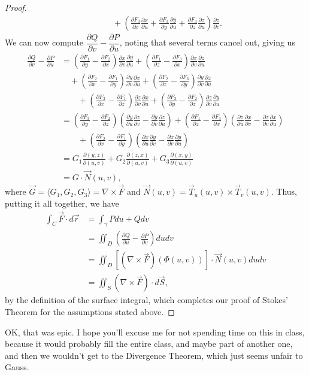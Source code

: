 \documentclass[12pt,letterpaper]{article}
\begin{document}
\begin{proof}
\begin{align*}
& \quad\quad +\left(\frac{\partial F_3}{\partial x}\frac{\partial x}{\partial u}+\frac{\partial F_3}{\partial y}\frac{\partial y}{\partial u}+\frac{\partial F_3}{\partial z}\frac{\partial z}{\partial u}\right)\frac{\partial z}{\partial v}.
\end{align*}
We can now compute $\dfrac{\partial Q}{\partial v}-\dfrac{\partial P}{\partial u}$, noting that several terms cancel out, giving us
\begin{align*}
 \frac{\partial Q}{\partial v}-\frac{\partial P}{\partial u} & = \left(\frac{\partial F_1}{\partial y}-\frac{\partial F_2}{\partial x}\right)\frac{\partial x}{\partial v}\frac{\partial y}{\partial u}+\left(\frac{\partial F_1}{\partial z}-\frac{\partial F_3}{\partial x}\right)\frac{\partial x}{\partial v}\frac{\partial z}{\partial u}\\
&\quad + \left(\frac{\partial F_2}{\partial x}-\frac{\partial F_1}{\partial y}\right)\frac{\partial y}{\partial v}\frac{\partial x}{\partial u}+\left(\frac{\partial F_2}{\partial z}-\frac{\partial F_3}{\partial y}\right)\frac{\partial y}{\partial v}\frac{\partial z}{\partial u}\\
&  \quad \quad + \left(\frac{\partial F_3}{\partial x}-\frac{\partial F_1}{\partial z}\right)\frac{\partial z}{\partial v}\frac{\partial x}{\partial u}+\left(\frac{\partial F_3}{\partial y}-\frac{\partial F_2}{\partial z}\right)\frac{\partial z}{\partial v}\frac{\partial y}{\partial u}\\
& = \left(\frac{\partial F_3}{\partial y}-\frac{\partial F_2}{\partial z}\right)\left(\frac{\partial y}{\partial u}\frac{\partial z}{\partial v}-\frac{\partial y}{\partial v}\frac{\partial z}{\partial u}\right)+\left(\frac{\partial F_1}{\partial z}-\frac{\partial F_3}{\partial x}\right)\left(\frac{\partial z}{\partial u}\frac{\partial x}{\partial v}-\frac{\partial z}{\partial v}\frac{\partial x}{\partial u}\right)\\
&\quad \quad +\left(\frac{\partial F_2}{\partial x}-\frac{\partial F_1}{\partial y}\right)\left(\frac{\partial x}{\partial u}\frac{\partial y}{\partial v}-\frac{\partial x}{\partial v}\frac{\partial y}{\partial u}\right)\\
& = G_1\frac{\partial(y,z)}{\partial(u,v)}+G_2\frac{\partial(z,x)}{\partial (u,v)}+G_3\frac{\partial (x,y)}{\partial (u,v)}\\
& = G\cdot \vec{N}(u,v),
\end{align*}
where $\vec{G} = \langle G_1,G_2,G_3\rangle = \nabla\times \vec{F}$ and $\vec{N}(u,v) = \vec{T}_u(u,v)\times\vec{T}_v(u,v)$. Thus, putting it all together, we have
\begin{align*}
 \int_C \vec{F}\cdot d\vec{r} & = \int_\gamma Pdu+Qdv \\
& = \iint_D \left(\frac{\partial Q}{\partial u}-\frac{\partial P}{\partial v}\right)dudv\\
& = \iint_D \left[(\nabla\times \vec{F})(\Phi(u,v))\right]\cdot \vec{N}(u,v) dudv\\
& = \iint_S \left(\nabla\times \vec{F}\right)\cdot d\vec{S},
\end{align*}
by the definition of the surface integral, which completes our proof of Stokes' Theorem for the assumptions stated above.
\end{proof}
OK, that was epic. I hope you'll excuse me for not spending time on this in class, because it would probably fill the entire class, and maybe part of another one, and then we wouldn't get to the Divergence Theorem, which just seems unfair to Gauss.
\end{document}
